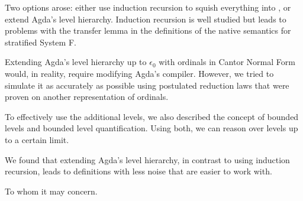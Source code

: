 \documentclass[manuscript,screen,review,anonymous]{acmart}
\begin{document}
Two options arose: either use induction recursion to squish everything into \Aset,
or extend Agda's level hierarchy.
Induction recursion is well studied but leads to problems with the transfer lemma in the definitions of the native semantics for stratified System F.

Extending Agda's level hierarchy up to $\epsilon_0$ with ordinals in Cantor Normal Form would, in reality,
require modifying Agda's compiler.
However, we tried to simulate it as accurately as possible using postulated reduction laws
that were proven on another representation of ordinals.

To effectively use the additional levels, we also described the concept of bounded levels and
bounded level quantification.
Using both, we can reason over levels up to a certain limit.

We found that extending Agda's level hierarchy, in contrast to using induction recursion,
leads to definitions with less noise that are easier to work with.

\begin{acks}
  To whom it may concern.
\end{acks}



\end{document}
